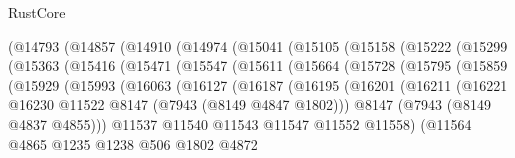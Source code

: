 \begin{lexlean}{RustCore}
\begin{coremodule}
            (@14793
              (@14857
                (@14910
                  (@14974
                    (@15041
                      (@15105
                        (@15158
                          (@15222
                            (@15299
                              (@15363
                                (@15416
                                  (@15471
                                    (@15547
                                      (@15611
                                        (@15664
                                          (@15728
                                            (@15795
                                              (@15859
                                                (@15929
                                                  (@15993
                                                    (@16063
                                                      (@16127
                                                        (@16187
                                                          (@16195
                                                            (@16201
                                                              (@16211
                                                                (@16221
                                                                  @16230
                                                                  @11522
                                                                  @8147
                                                                  (@7943 (@8149 @4847 @1802)))
                                                                @8147
                                                                (@7943 (@8149 @4837 @4855)))
                                                              @11537
                                                              @11540
                                                              @11543
                                                              @11547
                                                              @11552
                                                              @11558)
                                                            (@11564
                                                              @4865
                                                              @1235
                                                              @1238
                                                              @506
                                                              @1802
                                                              @4872

\end{coremodule}
\end{lexlean}
